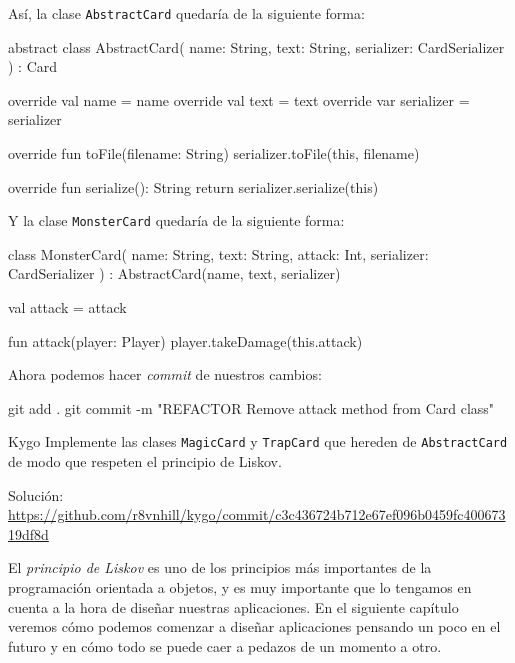   Así, la clase \texttt{AbstractCard} quedaría de la siguiente forma:

  \begin{kotlin}
    abstract class AbstractCard(
      name: String,
      text: String,
      serializer: CardSerializer
    ) : Card {
      override val name = name
      override val text = text
      override var serializer = serializer

      override fun toFile(filename: String) {
        serializer.toFile(this, filename)
      }

      override fun serialize(): String {
        return serializer.serialize(this)
      }
    }
  \end{kotlin}

  Y la clase \texttt{MonsterCard} quedaría de la siguiente forma:

  \begin{kotlin}
    class MonsterCard(
      name: String, text: String, attack: Int, serializer: CardSerializer
    ) : AbstractCard(name, text, serializer) {
      val attack = attack
        
      fun attack(player: Player) {
        player.takeDamage(this.attack)
      }
    }
  \end{kotlin}

  Ahora podemos hacer \textit{commit} de nuestros cambios:

  \begin{powershell}
    git add .
    git commit -m "REFACTOR Remove attack method from Card class"
  \end{powershell}

  \begin{ejercicio}{Kygo}
    Implemente las clases \texttt{MagicCard} y \texttt{TrapCard} que hereden de 
    \texttt{AbstractCard} de modo que respeten el principio de Liskov.

    {\footnotesize 
      Solución: 
      \url{https://github.com/r8vnhill/kygo/commit/c3c436724b712e67ef096b0459fc40067319df8d}
    }
  \end{ejercicio}
  
  El \textit{principio de Liskov} es uno de los principios más importantes de la programación 
  orientada a objetos, y es muy importante que lo tengamos en cuenta a la hora de diseñar nuestras
  aplicaciones.
  En el siguiente capítulo veremos cómo podemos comenzar a diseñar aplicaciones pensando un poco en
  el futuro y en cómo todo se puede caer a pedazos de un momento a otro.
